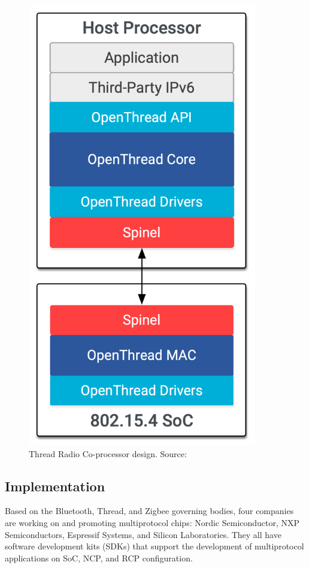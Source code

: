 \begin{figure}
    \centering
    \includegraphics[width=100mm, keepaspectratio]{figures/ot-arch-rcp-vert_2x.png}
    \caption{Thread Radio Co-processor design. Source: \cite{thread:platforms}}
    \label{fig:mp:thread-rcp}
\end{figure}

\subsection{Implementation}
\label{sec:multi:imp}
Based on the Bluetooth, Thread, and Zigbee governing bodies\cite{bt_members:2023, csa_members:2023, thread_members:2023}, four companies are working on and promoting multiprotocol chips: Nordic Semiconductor, NXP Semiconductors, Espressif Systems, and Silicon Laboratories. They all have software development kits (SDKs) that support the development of multiprotocol applications on SoC, NCP, and RCP configuration.

